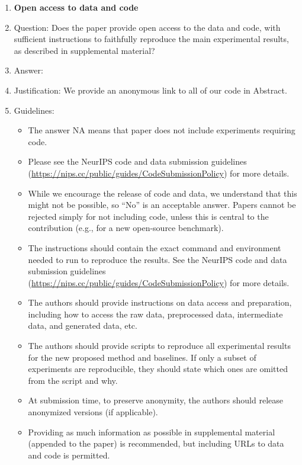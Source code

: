 \documentclass{article}
\theoremstyle{plain}
\theoremstyle{definition}
\theoremstyle{remark}
\begin{document}
\begin{enumerate}
\item {\bf Open access to data and code}
    \item[] Question: Does the paper provide open access to the data and code, with sufficient instructions to faithfully reproduce the main experimental results, as described in supplemental material?
    \item[] Answer: \answerYes{} %
    \item[] Justification: We provide an anonymous link to all of our code in Abstract.
    \item[] Guidelines:
    \begin{itemize}
        \item The answer NA means that paper does not include experiments requiring code.
        \item Please see the NeurIPS code and data submission guidelines (\url{https://nips.cc/public/guides/CodeSubmissionPolicy}) for more details.
        \item While we encourage the release of code and data, we understand that this might not be possible, so “No” is an acceptable answer. Papers cannot be rejected simply for not including code, unless this is central to the contribution (e.g., for a new open-source benchmark).
        \item The instructions should contain the exact command and environment needed to run to reproduce the results. See the NeurIPS code and data submission guidelines (\url{https://nips.cc/public/guides/CodeSubmissionPolicy}) for more details.
        \item The authors should provide instructions on data access and preparation, including how to access the raw data, preprocessed data, intermediate data, and generated data, etc.
        \item The authors should provide scripts to reproduce all experimental results for the new proposed method and baselines. If only a subset of experiments are reproducible, they should state which ones are omitted from the script and why.
        \item At submission time, to preserve anonymity, the authors should release anonymized versions (if applicable).
        \item Providing as much information as possible in supplemental material (appended to the paper) is recommended, but including URLs to data and code is permitted.
    \end{itemize}



\end{enumerate}
\end{document}
